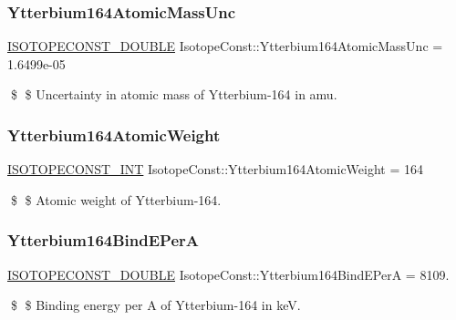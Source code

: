 \subsubsection{\texorpdfstring{Ytterbium164\+Atomic\+Mass\+Unc}{Ytterbium164AtomicMassUnc}}
{\footnotesize\ttfamily \mbox{\hyperlink{group___isotope_const-_macros_ga8f45a7272ce02c0b4c65c44636ed719a}{I\+S\+O\+T\+O\+P\+E\+C\+O\+N\+S\+T\+\_\+\+D\+O\+U\+B\+LE}} Isotope\+Const\+::\+Ytterbium164\+Atomic\+Mass\+Unc = 1.\+6499e-\/05}

\$ \$ Uncertainty in atomic mass of Ytterbium-\/164 in amu. \mbox{\label{group___isotope_const-_ytterbium-_yb164_ga1fff978e5fee1405597848121574fdfa}} 
\subsubsection{\texorpdfstring{Ytterbium164\+Atomic\+Weight}{Ytterbium164AtomicWeight}}
{\footnotesize\ttfamily \mbox{\hyperlink{group___isotope_const-_macros_ga5f18360b3e99483a35c32d789e62621c}{I\+S\+O\+T\+O\+P\+E\+C\+O\+N\+S\+T\+\_\+\+I\+NT}} Isotope\+Const\+::\+Ytterbium164\+Atomic\+Weight = 164}

\$ \$ Atomic weight of Ytterbium-\/164. \mbox{\label{group___isotope_const-_ytterbium-_yb164_ga72f5e148e742bde856fd8c7605481703}} 
\subsubsection{\texorpdfstring{Ytterbium164\+Bind\+E\+PerA}{Ytterbium164BindEPerA}}
{\footnotesize\ttfamily \mbox{\hyperlink{group___isotope_const-_macros_ga8f45a7272ce02c0b4c65c44636ed719a}{I\+S\+O\+T\+O\+P\+E\+C\+O\+N\+S\+T\+\_\+\+D\+O\+U\+B\+LE}} Isotope\+Const\+::\+Ytterbium164\+Bind\+E\+PerA = 8109.}

\$ \$ Binding energy per A of Ytterbium-\/164 in keV. \mbox{\label{group___isotope_const-_ytterbium-_yb164_ga0a419a6da4e8a57344887a1e27026556}} 
